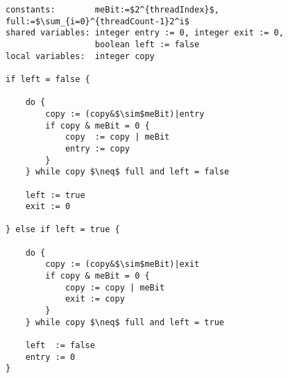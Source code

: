 \begin{lstlisting}[mathescape]
constants:        meBit:=$2^{threadIndex}$, full:=$\sum_{i=0}^{threadCount-1}2^i$
shared variables: integer entry := 0, integer exit := 0,
                  boolean left := false
local variables:  integer copy

if left = false {

	do {
		copy := (copy&$\sim$meBit)|entry
		if copy & meBit = 0 {
			copy  := copy | meBit
			entry := copy
		}
	} while copy $\neq$ full and left = false

	left := true
	exit := 0

} else if left = true {

	do {
		copy := (copy&$\sim$meBit)|exit
		if copy & meBit = 0 {
			copy := copy | meBit
			exit := copy
		}
	} while copy $\neq$ full and left = true

	left  := false
	entry := 0
}
\end{lstlisting}
